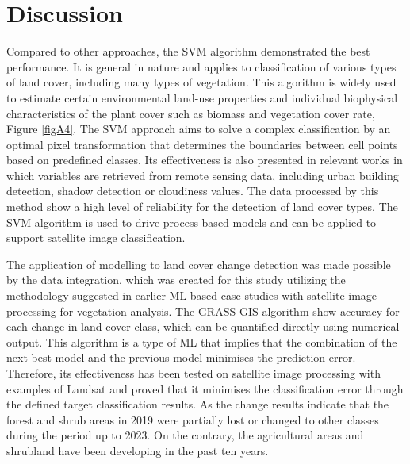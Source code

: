 \documentclass[jimaging,article,submit,pdftex,moreauthors]{Definitions/mdpi}
\begin{document}
\section{Discussion}

{Compared to other approaches, the SVM algorithm demonstrated the best performance. It is general in nature and applies to classification of various types of land cover, including many types of vegetation. This algorithm is widely used to estimate certain environmental land-use properties and individual biophysical characteristics of the plant cover such as biomass and vegetation cover rate}, Figure \ref{figA4}. The SVM approach aims to solve a complex classification by an optimal pixel transformation that determines the boundaries between cell points based on predefined classes. Its effectiveness is also presented in relevant works in which variables are retrieved from remote sensing data, including urban building detection, shadow detection or cloudiness values. The data processed by this method show a high level of reliability for the detection of land cover types. The SVM algorithm is used to drive process-based models and can be applied to support satellite image classification.

The application of modelling to land cover change detection was made possible by the data integration, which was created for this study utilizing the methodology suggested in earlier ML-based case studies with satellite image processing for vegetation analysis. The GRASS GIS algorithm show accuracy for each change in land cover class, which can be quantified directly using numerical output. This algorithm is a type of ML that implies that the combination of the next best model and the previous model minimises the prediction error. Therefore, its effectiveness has been tested on satellite image processing with examples of Landsat and proved that it minimises the classification error through the defined target classification results. As the change results indicate that the forest and shrub areas in 2019 were partially lost or changed to other classes during the period up to 2023. On the contrary, the agricultural areas and shrubland have been developing in the past ten years.
\end{document}
